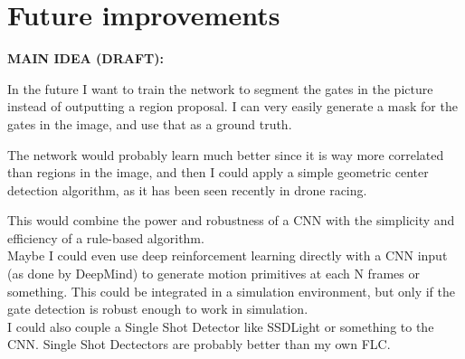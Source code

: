 \chapter{Future improvements}

\textbf{MAIN IDEA (DRAFT):\\}

In the future I want to train the network to segment the gates in the
picture instead of outputting a region proposal. I can very easily generate a
mask for the gates in the image, and use that as a ground truth.

The network would probably learn much better since it is way more correlated
than regions in the image, and then I could apply a simple geometric center
detection algorithm, as it has been seen recently in drone racing.


This would combine the power and robustness of a CNN with the simplicity and
efficiency of a rule-based algorithm.\\


Maybe I could even use deep reinforcement learning directly with a CNN input
(as done by DeepMind) to generate motion primitives at each N frames or
something. This could be integrated in a simulation environment, but only if
the gate detection is robust enough to work in simulation.\\

I could also couple a Single Shot Detector like SSDLight or something to the
CNN. Single Shot Dectectors are probably better than my own FLC.
